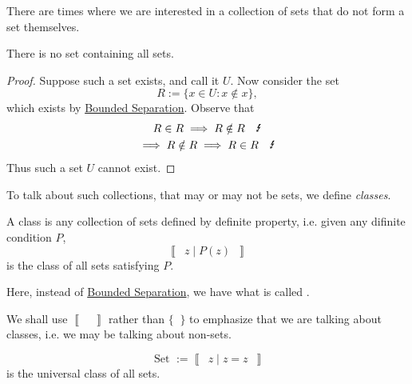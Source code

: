 \documentclass[notoc,notitlepage]{tufte-book}
\newcommand{\class}[1]{\left\llbracket \enspace #1 \enspace \right\rrbracket}
\begin{document}
There are times where we are interested in a collection of sets that do not form a set themselves.

\begin{eg}
  There is no set containing all sets.

  \begin{proof}
    Suppose such a set exists, and call it $U$. Now consider the set
    \begin{equation*}
      R := \{ x \in U : x \notin x \},
    \end{equation*}
    which exists by \hyperref[axiom:bounded_separation_axiom]{Bounded Separation}. Observe that
    \begin{gather*}
      R \in R \implies R \notin R \quad \text{\Lightning} \\
      \implies R \notin R \implies R \in R \quad \text{\Lightning}
    \end{gather*}
    Thus such a set $U$ cannot exist.
  \end{proof}
\end{eg}

To talk about such collections, that may or may not be sets, we define \textit{classes}.

\begin{defn}[Class]
\label{defn:class}
  A class is any collection of sets defined by definite property, i.e. given any difinite condition $P$,
  \begin{equation*}
    \class{ z \mid P(z) }
  \end{equation*}
  is the class of all sets satisfying $P$.
\end{defn}

Here, instead of \hyperref[axiom:bounded_separation_axiom]{Bounded Separation}, we have what is called .

\begin{note}
  We shall use $\class{}$ rather than $\{ \; \; \}$ to emphasize that we are talking about classes, i.e. we may be talking about non-sets.
\end{note}

\begin{eg}
  \begin{equation*}
    \text{ Set } := \class{ z \mid z = z }
  \end{equation*}
  is the universal class of all sets.
\end{eg}
\end{document}
